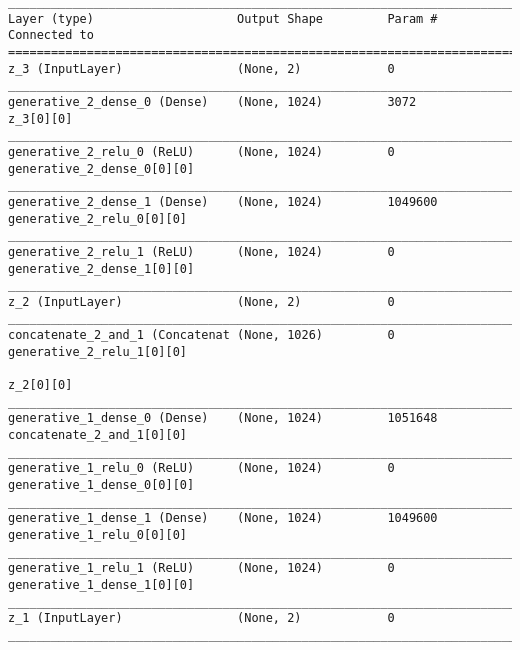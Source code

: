 \begin{lstlisting}[caption={\textsc{Mnist}-VLAE-GAN Decoder},captionpos=b,basicstyle=\tiny, label={lst:mnist-vlae-gan-decoder}]
__________________________________________________________________________________________________
Layer (type)                    Output Shape         Param #     Connected to
==================================================================================================
z_3 (InputLayer)                (None, 2)            0
__________________________________________________________________________________________________
generative_2_dense_0 (Dense)    (None, 1024)         3072        z_3[0][0]
__________________________________________________________________________________________________
generative_2_relu_0 (ReLU)      (None, 1024)         0           generative_2_dense_0[0][0]
__________________________________________________________________________________________________
generative_2_dense_1 (Dense)    (None, 1024)         1049600     generative_2_relu_0[0][0]
__________________________________________________________________________________________________
generative_2_relu_1 (ReLU)      (None, 1024)         0           generative_2_dense_1[0][0]
__________________________________________________________________________________________________
z_2 (InputLayer)                (None, 2)            0
__________________________________________________________________________________________________
concatenate_2_and_1 (Concatenat (None, 1026)         0           generative_2_relu_1[0][0]
                                                                 z_2[0][0]
__________________________________________________________________________________________________
generative_1_dense_0 (Dense)    (None, 1024)         1051648     concatenate_2_and_1[0][0]
__________________________________________________________________________________________________
generative_1_relu_0 (ReLU)      (None, 1024)         0           generative_1_dense_0[0][0]
__________________________________________________________________________________________________
generative_1_dense_1 (Dense)    (None, 1024)         1049600     generative_1_relu_0[0][0]
__________________________________________________________________________________________________
generative_1_relu_1 (ReLU)      (None, 1024)         0           generative_1_dense_1[0][0]
__________________________________________________________________________________________________
z_1 (InputLayer)                (None, 2)            0
__________________________________________________________________________________________________

\end{lstlisting}
